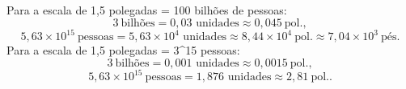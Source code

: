 Para a escala de 1,5 polegadas = 100 bilhões de pessoas:
\[
3\ \text{bilhões} = 0{,}03\text{ unidades} \approx0{,}045\ \text{pol.},
\]
\[
5{,}63\times10^{15}\ \text{pessoas} = 5{,}63\times10^{4}\text{ unidades} \approx8{,}44\times10^{4}\ \text{pol.} \approx7{,}04\times10^{3}\ \text{pés}.
\]
Para a escala de 1,5 polegadas = 3^{15} pessoas:
\[
3\ \text{bilhões} = 0{,}001\text{ unidades} \approx0{,}0015\ \text{pol.},
\]
\[
5{,}63\times10^{15}\ \text{pessoas} = 1{,}876\text{ unidades} \approx2{,}81\ \text{pol.}.
\]